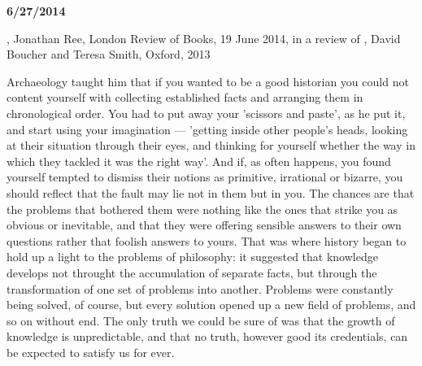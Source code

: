 
{\bf 6/27/2014}

, Jonathan Ree, London Review of Books, 19 June
2014, in a review of , David
Boucher and Teresa Smith, Oxford, 2013

Archaeology taught him that if you wanted to be a good historian you
could not content yourself with collecting established facts and
arranging them in chronological order. You had to put away your
'scissors and paste', as he put it, and start using your imagination
--- 'getting inside other people's heads, looking at their situation
through their eyes, and thinking for yourself whether the way in which
they tackled it was the right way'. And if, as often happens, you
found yourself tempted to dismiss their notions as primitive,
irrational or bizarre, you should reflect that the fault may lie not
in them but in you. The chances are that the problems that bothered
them were nothing like the ones that strike you as obvious or
inevitable, and that they were offering sensible answers to their own
questions rather that foolish answers to yours. That was where history
began to hold up a light to the problems of philosophy: it suggested
that knowledge develops not throught the accumulation of separate
facts, but through the transformation of one set of problems into
another. Problems were constantly being solved, of course, but every
solution opened up a new field of problems, and so on without end. The
only truth we could be sure of was that the growth of knowledge is
unpredictable, and that no truth, however good its credentials, can be
expected to satisfy us for ever.

